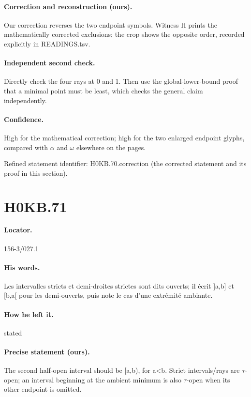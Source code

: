 \paragraph{Correction and reconstruction (ours).} Our correction reverses the two endpoint symbols. Witness H prints the mathematically corrected exclusions; the crop shows the opposite order, recorded explicitly in READINGS.tsv.

\paragraph{Independent second check.} Directly check the four rays at 0 and 1. Then use the global-lower-bound proof that a minimal point must be least, which checks the general claim independently.

\paragraph{Confidence.} High for the mathematical correction; high for the two enlarged endpoint glyphs, compared with \ensuremath{\alpha} and \ensuremath{\omega} elsewhere on the pages.

\noindent Refined statement identifier: H0KB.70.correction (the corrected statement and its proof in this section).

\section*{H0KB.71}\label{statement:H0KB.71}
\paragraph{Locator.} 156-3/027.1

\paragraph{His words.} Les intervalles stricts et demi-droites strictes sont dits ouverts; il écrit ]a,b] et [b,a[ pour les demi-ouverts, puis note le cas d’une extrémité ambiante.

\paragraph{How he left it.} stated

\paragraph{Precise statement (ours).} The second half-open interval should be [a,b), for a<b. Strict intervals/rays are \ensuremath{\tau}-open; an interval beginning at the ambient minimum is also \ensuremath{\tau}-open when its other endpoint is omitted.

